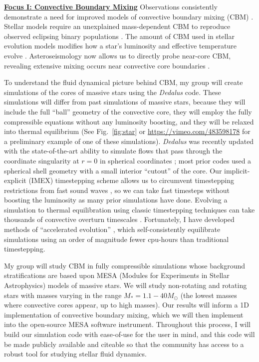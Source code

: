 \documentclass[12pt]{article}
\newcommand{\sct}[1]{\vspace{0.3cm}\hspace{-\parindent}\textbf{\underline{#1}}\hspace{0.3cm}}
\begin{document}
\sct{Focus I: Convective Boundary Mixing}
Observations consistently demonstrate a need for improved models of convective boundary mixing (CBM) \citep{johnston2021}.
Stellar models require an unexplained mass-dependent CBM to reproduce observed eclipsing binary populations  \citep{claret_torres_2019}.
The amount of CBM used in stellar evolution models modifies how a star's luminosity and effective temperature evolve \citep{castro_etal_2014,higgins_vink_2019}.
Asteroseismology now allows us to directly probe near-core CBM, revealing extensive mixing occurs near convective core boundaries \citep{michielsen_etal_2019, pedersen_etal_2021}.

To understand the fluid dynamical picture behind CBM, my group will create simulations of the cores of massive stars using the \emph{Dedalus} \citep{burns_etal_2020} code.
These simulations will differ from past simulations of massive stars, because they will include the full ``ball'' geometry of the convective core, they will employ the fully compressible equations without any luminosity boosting, and they will be relaxed into thermal equilibrium (See Fig.~\ref{fig:star} or \url{https://vimeo.com/483598178} for a preliminary example of one of these simulations).
\emph{Dedalus} was recently updated with the state-of-the-art ability to simulate flows that pass through the coordinate singularity at $r = 0$ in spherical coordinates \citep{vasil_etal_2019,lecoanet_etal_2019}; most prior codes used a spherical shell geometry with a small interior ``cutout'' of the core.
Our implicit-explicit (IMEX) timestepping scheme allows us to circumvent timestepping restrictions from fast sound waves \citep{anders_brown_2017}, so we can take fast timesteps without boosting the luminosity as many prior simulations have done.
Evolving a simulation to thermal equilibration using classic timestepping techniques can take thousands of convective overturn timescales \citep{anders_etal_2022a,anders_etal_2022b}.
Fortunately, I have developed methods of ``accelerated evolution'' \citep{anders_etal_2018}, which self-consistently equilibrate simulations using an order of magnitude fewer cpu-hours than traditional timestepping.

My group will study CBM in fully compressible simulations whose background stratifications are based upon MESA (Modules for Experiments in Stellar Astrophysics) models of massive stars.
We will study non-rotating and rotating stars with masses varying in the range $M_* = 1.1-40 M_{\odot}$ (the lowest masses where convective cores appear, up to high masses).
Our results will inform a 1D implementation of convective boundary mixing, which we will then implement into the open-source MESA software instrument.
Throughout this process, I will build our simulation code with ease-of-use for the user in mind, and this code will be made publicly available and citeable so that the community has access to a robust tool for studying stellar fluid dynamics.
\end{document}
